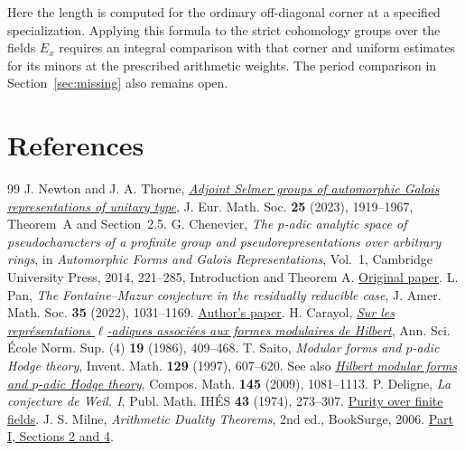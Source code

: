 \documentclass[a4paper,11pt]{article}
\theoremstyle{definition}
\theoremstyle{remark}
\numberwithin{equation}{section}
\begin{document}
Here the length is computed for the ordinary off-diagonal
corner at a specified specialization. Applying this formula
to the strict cohomology groups over the fields \(E_x\)
requires an integral comparison with that corner and
uniform estimates for its minors at the prescribed arithmetic
weights. The period comparison in Section~\ref{sec:missing}
also remains open.

\clearpage
\section{References}\label{nav:bibliography-VIII}
\begingroup{}\begin{thebibliography}{99}\small
{} J. Newton and J. A. Thorne, \href{https://arxiv.org/pdf/1912.11265}{\emph{Adjoint Selmer groups of automorphic Galois representations of unitary type}}, J. Eur. Math. Soc. \textbf{25} (2023), 1919--1967, Theorem~A and Section~2.5.
 G. Chenevier, \emph{The \(p\)-adic analytic space of pseudocharacters of a profinite group and pseudorepresentations over arbitrary rings}, in \emph{Automorphic Forms and Galois Representations}, Vol.~1, Cambridge University Press, 2014, 221--285, Introduction and Theorem A. \href{https://gaetan.chenevier.perso.math.cnrs.fr/articles/determinants.pdf}{Original paper}.
 L. Pan, \emph{The Fontaine--Mazur conjecture in the residually reducible case}, J. Amer. Math. Soc. \textbf{35} (2022), 1031--1169. \href{https://arxiv.org/abs/1901.07166}{Author's paper}.
 H. Carayol, \href{https://www.numdam.org/articles/10.24033/asens.1512/}{\emph{Sur les repr\'esentations \(\ell\)-adiques associ\'ees aux formes modulaires de Hilbert}}, Ann. Sci. \'Ecole Norm. Sup. (4) \textbf{19} (1986), 409--468.
 T. Saito, \emph{Modular forms and \(p\)-adic Hodge theory}, Invent. Math. \textbf{129} (1997), 607--620. See also \href{https://www.ms.u-tokyo.ac.jp/~t-saito/pp/h.pdf}{\emph{Hilbert modular forms and \(p\)-adic Hodge theory}}, Compos. Math. \textbf{145} (2009), 1081--1113.
 P. Deligne, \emph{La conjecture de Weil. I}, Publ. Math. IH\'ES \textbf{43} (1974), 273--307. \href{https://www.numdam.org/item/PMIHES_1974__43__273_0/}{Purity over finite fields}.
 J. S. Milne, \emph{Arithmetic Duality Theorems}, 2nd ed., BookSurge, 2006. \href{https://www.jmilne.org/math/Books/ADTnot.pdf}{Part I, Sections 2 and 4}.

\end{thebibliography}
\end{document}
